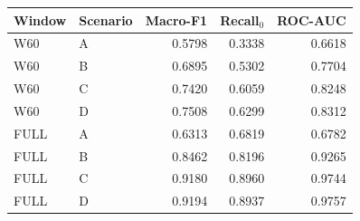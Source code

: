 \small
\setlength{\tabcolsep}{4pt}
\begin{tabular}{@{}llrrr@{}}
\toprule
Window & Scenario & Macro-F1 & Recall$_0$ & ROC-AUC \\
\midrule
W60 & A & 0.5798 & 0.3338 & 0.6618 \\
W60 & B & 0.6895 & 0.5302 & 0.7704 \\
W60 & C & 0.7420 & 0.6059 & 0.8248 \\
W60 & D & 0.7508 & 0.6299 & 0.8312 \\
FULL & A & 0.6313 & 0.6819 & 0.6782 \\
FULL & B & 0.8462 & 0.8196 & 0.9265 \\
FULL & C & 0.9180 & 0.8960 & 0.9744 \\
FULL & D & 0.9194 & 0.8937 & 0.9757 \\
\bottomrule
\end{tabular}
